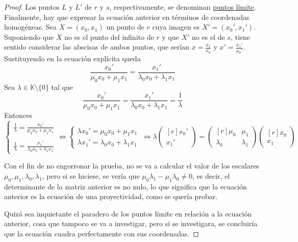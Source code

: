 \documentclass[12pt]{report}
\theoremstyle{definition}
\theoremstyle{definition}
\theoremstyle{remark}
\begin{document}
\begin{proof}
\vspace{2mm}
Los puntos $L$ y $L'$ de $r$ y $s$, respectivamente, se denominan \ul{puntos límite}. Finalmente, hay que expresar la ecuación anterior en términos de coordenadas homogéneas. Sea $X = (x_0,x_1)$ un punto de $r$ cuya imagen es $X' = (x_0',x_1')$. Suponiendo que $X$ no es el punto del infinito de $r$ y que $X'$ no es el de $s$, tiene sentido considerar las abscisas de ambos puntos, que serían $x = \frac{x_1}{x_0}$ y $x' = \frac{x_1'}{x_0'}$. Sustituyendo en la ecuación explícita queda
\[\frac{x_0'}{\mu_0x_0+\mu_1x_1} = \frac{x_1'}{\lambda_0x_0+\lambda_1x_1}\]
Sea $\lambda \in \mathbb{K} \setminus \{0\}$ tal que
\[\frac{x_0'}{\mu_0x_0+\mu_1x_1} = \frac{x_1'}{\lambda_0x_0+\lambda_1x_1} = \frac{1}{\lambda}\]
Entonces
\[\begin{cases}
    \displaystyle \frac{1}{\lambda} = \frac{x_0'}{\mu_0x_0+\mu_1x_1} \\
    \\
    \displaystyle\frac{1}{\lambda} = \frac{x_1'}{\lambda_0x_0+\lambda_1x_1}
\end{cases} \iff
\begin{cases}
    \lambda x_0' = \mu_0x_0 + \mu_1x_1 \
    \\
    \lambda x_1' = \lambda_0x_0+\lambda_1x_1
\end{cases} \iff
\lambda \begin{pmatrix*}[r]
    x_0' \\
    x_1'
\end{pmatrix*} = \begin{pmatrix*}[r]
    \mu_0 & \mu_1 \\
    \lambda_0 & \lambda_1
\end{pmatrix*}\begin{pmatrix*}[r]
    x_0 \\
    x_1
\end{pmatrix*}\]

Con el fin de no engorronar la prueba, no se va a calcular el valor de los escalares $\mu_0, \mu_1, \lambda_0, \lambda_1$, pero si se hiciese, se vería que $\mu_0\lambda_1 - \mu_1\lambda_0 \neq 0$, es decir, el determinante de la matriz anterior es no nulo, lo que significa que la ecuación anterior es la ecuación de una proyectividad, como se quería probar.

\vspace{2mm}
Quizá sea inquietante el paradero de los puntos límite en relación a la ecuación anterior, cosa que tampoco se va a investigar, pero si se investigara, se concluiría que la ecuación cuadra perfectamente con sus coordenadas.
\end{proof}
\end{document}
